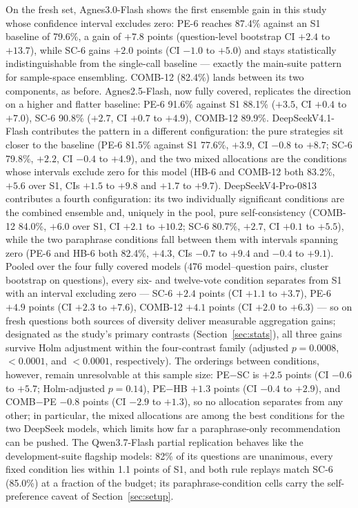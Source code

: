 On the fresh set, Agnes3.0-Flash shows the first ensemble gain in this study whose confidence interval excludes zero: PE-6 reaches 87.4\% against an S1 baseline of 79.6\%, a gain of $+7.8$ points (question-level bootstrap CI $+2.4$ to $+13.7$), while SC-6 gains $+2.0$ points (CI $-1.0$ to $+5.0$) and stays statistically indistinguishable from the single-call baseline --- exactly the main-suite pattern for sample-space ensembling. COMB-12 (82.4\%) lands between its two components, as before. Agnes2.5-Flash, now fully covered, replicates the direction on a higher and flatter baseline: PE-6 91.6\% against S1 88.1\% ($+3.5$, CI $+0.4$ to $+7.0$), SC-6 90.8\% ($+2.7$, CI $+0.7$ to $+4.9$), COMB-12 89.9\%. DeepSeekV4.1-Flash contributes the pattern in a different configuration: the pure strategies sit closer to the baseline (PE-6 81.5\% against S1 77.6\%, $+3.9$, CI $-0.8$ to $+8.7$; SC-6 79.8\%, $+2.2$, CI $-0.4$ to $+4.9$), and the two mixed allocations are the conditions whose intervals exclude zero for this model (HB-6 and COMB-12 both 83.2\%, $+5.6$ over S1, CIs $+1.5$ to $+9.8$ and $+1.7$ to $+9.7$). DeepSeekV4-Pro-0813 contributes a fourth configuration: its two individually significant conditions are the combined ensemble and, uniquely in the pool, pure self-consistency (COMB-12 84.0\%, $+6.0$ over S1, CI $+2.1$ to $+10.2$; SC-6 80.7\%, $+2.7$, CI $+0.1$ to $+5.5$), while the two paraphrase conditions fall between them with intervals spanning zero (PE-6 and HB-6 both 82.4\%, $+4.3$, CIs $-0.7$ to $+9.4$ and $-0.4$ to $+9.1$). Pooled over the four fully covered models (476 model--question pairs, cluster bootstrap on questions), every six- and twelve-vote condition separates from S1 with an interval excluding zero --- SC-6 $+2.4$ points (CI $+1.1$ to $+3.7$), PE-6 $+4.9$ points (CI $+2.3$ to $+7.6$), COMB-12 $+4.1$ points (CI $+2.0$ to $+6.3$) --- so on fresh questions both sources of diversity deliver measurable aggregation gains; designated as the study's primary contrasts (Section~\ref{sec:stats}), all three gains survive Holm adjustment within the four-contrast family (adjusted $p = 0.0008$, $<0.0001$, and $<0.0001$, respectively). The orderings between conditions, however, remain unresolvable at this sample size: PE$-$SC is $+2.5$ points (CI $-0.6$ to $+5.7$; Holm-adjusted $p = 0.14$), PE$-$HB $+1.3$ points (CI $-0.4$ to $+2.9$), and COMB$-$PE $-0.8$ points (CI $-2.9$ to $+1.3$), so no allocation separates from any other; in particular, the mixed allocations are among the best conditions for the two DeepSeek models, which limits how far a paraphrase-only recommendation can be pushed. The Qwen3.7-Flash partial replication behaves like the development-suite flagship models: 82\% of its questions are unanimous, every fixed condition lies within 1.1 points of S1, and both rule replays match SC-6 (85.0\%) at a fraction of the budget; its paraphrase-condition cells carry the self-preference caveat of Section~\ref{sec:setup}.

